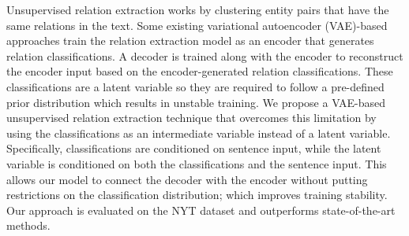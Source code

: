Unsupervised relation extraction works by clustering entity pairs that have the same relations in the text. Some existing variational autoencoder (VAE)-based approaches train the relation extraction model as an encoder that generates relation classifications. A decoder is trained along with the encoder to reconstruct the encoder input based on the encoder-generated relation classifications. These classifications are a latent variable so they are required to follow a pre-defined prior distribution which results in unstable training. We propose a VAE-based unsupervised relation extraction technique that overcomes this limitation by using the classifications as an intermediate variable instead of a latent variable. Specifically, classifications are conditioned on sentence input, while the latent variable is conditioned on both the classifications and the sentence input. This allows our model to connect the decoder with the encoder without putting restrictions on the classification distribution; which improves training stability. Our approach is evaluated on the NYT dataset and outperforms state-of-the-art methods.
